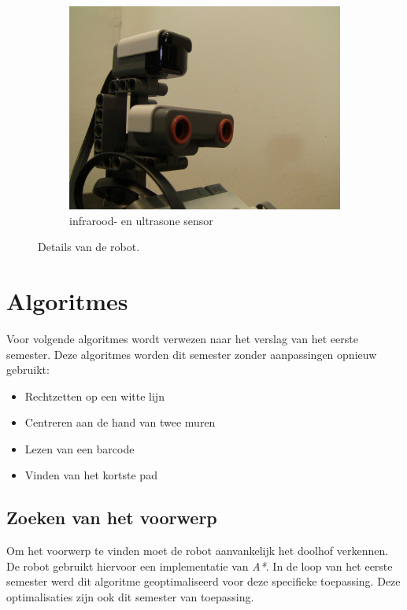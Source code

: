 \documentclass[tt2]{penoverslag}
\begin{document}
\begin{figure}
\begin{subfigure}[h]{0.33\textwidth}
		\includegraphics[width=\textwidth]{robotSensoren}
		\caption{infrarood- en ultrasone sensor}
	\end{subfigure}
\caption{Details van de robot.}
\label{fig:robotDetail}
\end{figure}


\section{Algoritmes}
Voor volgende algoritmes wordt verwezen naar het verslag van het eerste semester. Deze algoritmes worden dit semester zonder aanpassingen opnieuw gebruikt:
\begin{itemize}
	\item Rechtzetten op een witte lijn
	\item Centreren aan de hand van twee muren
	\item Lezen van een barcode
	\item Vinden van het kortste pad
\end{itemize}

\subsection{Zoeken van het voorwerp} %
\label{ssec:algoZoek}
Om het voorwerp te vinden moet de robot aanvankelijk het doolhof verkennen. De robot gebruikt hiervoor een implementatie van \textit{A*}. In de loop van het eerste semester werd dit algoritme geoptimaliseerd voor deze specifieke toepassing. Deze optimalisaties zijn ook dit semester van toepassing. \\
\end{document}
